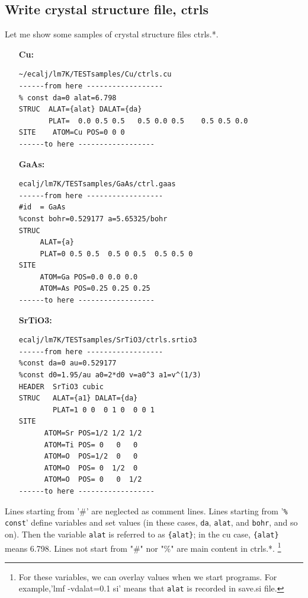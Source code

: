 \documentclass[a4paper,10pt,epsf,fleqn]{article}
\newcommand{\io}[1]{{\sf  #1}\index{#1}}
\newcommand{\ctrls}{{\io{ctrls.*}\space }}
\begin{document}
\subsection{Write crystal structure file, ctrls}
\label{ctrls}
Let me show some samples of crystal structure files \ctrls. 
\begin{itemize}
\item[\bf Cu:]
\begin{verbatim}
~/ecalj/lm7K/TESTsamples/Cu/ctrls.cu
------from here ------------------
% const da=0 alat=6.798
STRUC  ALAT={alat} DALAT={da}
       PLAT=  0.0 0.5 0.5   0.5 0.0 0.5    0.5 0.5 0.0
SITE    ATOM=Cu POS=0 0 0
------to here ------------------
\end{verbatim}

\item[\bf GaAs:]
\begin{verbatim}
ecalj/lm7K/TESTsamples/GaAs/ctrl.gaas
------from here ------------------
#id  = GaAs
%const bohr=0.529177 a=5.65325/bohr 
STRUC
     ALAT={a} 
     PLAT=0 0.5 0.5  0.5 0 0.5  0.5 0.5 0 
SITE
     ATOM=Ga POS=0.0 0.0 0.0
     ATOM=As POS=0.25 0.25 0.25
------to here ------------------
\end{verbatim}
\item[\bf SrTiO3:]
\begin{verbatim}
ecalj/lm7K/TESTsamples/SrTiO3/ctrls.srtio3 
------from here ------------------
%const da=0 au=0.529177
%const d0=1.95/au a0=2*d0 v=a0^3 a1=v^(1/3)
HEADER  SrTiO3 cubic 
STRUC   ALAT={a1} DALAT={da} 
        PLAT=1 0 0  0 1 0  0 0 1
SITE
      ATOM=Sr POS=1/2 1/2 1/2
      ATOM=Ti POS= 0   0   0
      ATOM=O  POS=1/2  0   0
      ATOM=O  POS= 0  1/2  0
      ATOM=O  POS= 0   0  1/2
------to here ------------------
\end{verbatim}
\end{itemize}

Lines starting from '\#' are neglected as comment lines.
Lines starting from '\verb+% const+' define variables and set values
(in these cases, \verb+da+, \verb+alat+, and \verb+bohr+, and so on). 
Then the variable \verb+alat+ is referred to as \verb+{alat}+; in the cu case,
\verb+{alat}+ means 6.798.
Lines not start from "\#" nor "\%" are main content in \ctrls.
\footnote{For these variables, we can overlay values when we start
programs. For example,'lmf -vdalat=0.1 si' means that \texttt{alat} is recorded in save.si file.}
\end{document}
